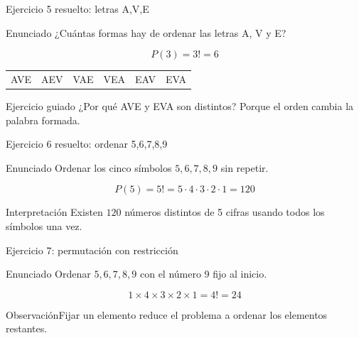 \documentclass[aspectratio=169,11pt]{beamer}
\newcommand{\observacion}[1]{\begin{block}{Observación}#1\end{block}}
\begin{document}
\begin{frame}{Ejercicio 5 resuelto: letras A,V,E}
\begin{block}{Enunciado}
¿Cuántas formas hay de ordenar las letras A, V y E?
\end{block}
\[
P(3)=3!=6
\]
\begin{center}
\begin{tabular}{cccccc}
AVE & AEV & VAE & VEA & EAV & EVA
\end{tabular}
\end{center}
\begin{exampleblock}{Ejercicio guiado}
¿Por qué AVE y EVA son distintos? \pause Porque el orden cambia la palabra formada.
\end{exampleblock}
\end{frame}

\begin{frame}{Ejercicio 6 resuelto: ordenar 5,6,7,8,9}
\begin{block}{Enunciado}
Ordenar los cinco símbolos $5,6,7,8,9$ sin repetir.
\end{block}
\pause
\[
P(5)=5!=5\cdot4\cdot3\cdot2\cdot1=120
\]
\begin{exampleblock}{Interpretación}
Existen $120$ números distintos de 5 cifras usando todos los símbolos una vez.
\end{exampleblock}
\end{frame}

\begin{frame}{Ejercicio 7: permutación con restricción}
\begin{block}{Enunciado}
Ordenar $5,6,7,8,9$ con el número 9 fijo al inicio.
\end{block}
\pause
\begin{center}
\end{center}
\[
1\times4\times3\times2\times1=4!=24
\]
\observacion{Fijar un elemento reduce el problema a ordenar los elementos restantes.}
\end{frame}
\end{document}
